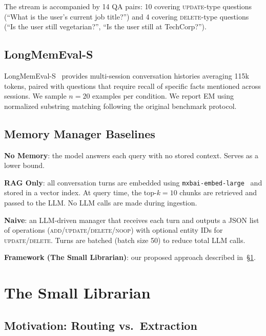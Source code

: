 \documentclass[10pt, twocolumn]{article}
\begin{document}
The stream is accompanied by 14 QA pairs: 10 covering \textsc{update}-type
questions (``What is the user's current job title?'') and 4 covering
\textsc{delete}-type questions (``Is the user still vegetarian?'',
``Is the user still at TechCorp?'').

\subsection{LongMemEval-S}
\label{sec:longmemeval}

LongMemEval-S~\cite{wu2024longmemeval} provides multi-session conversation
histories averaging 115k tokens, paired with questions that require recall
of specific facts mentioned across sessions.
We sample $n=20$ examples per condition.
We report EM using normalized substring matching following the original
benchmark protocol.

\subsection{Memory Manager Baselines}

\textbf{No Memory}: the model answers each query with no stored context.
Serves as a lower bound.

\textbf{RAG Only}: all conversation turns are embedded using
\texttt{mxbai-embed-large}~\cite{emb2024mxbai} and stored in a vector
index.
At query time, the top-$k=10$ chunks are retrieved and passed to the
LLM.
No LLM calls are made during ingestion.

\textbf{Naive}: an LLM-driven manager that receives each turn and outputs
a JSON list of operations (\textsc{add}/\textsc{update}/\textsc{delete}/\textsc{noop})
with optional entity IDs for \textsc{update}/\textsc{delete}.
Turns are batched (batch size 50) to reduce total LLM calls.

\textbf{Framework (The Small Librarian)}: our proposed approach described
in~\S\ref{sec:framework}.

\section{The Small Librarian}
\label{sec:framework}

\subsection{Motivation: Routing vs.\ Extraction}
\end{document}
